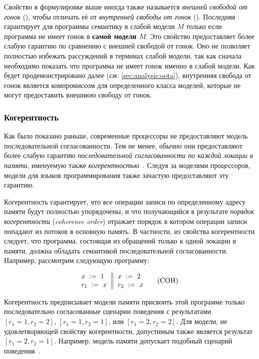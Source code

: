 Свойство \DRF в формулировке выше иногда также называется
\emph{внешней свободой от гонок} (\eDRF), 
чтобы отличать её от \emph{внутренней свободы от гонок} (\iDRF).
Последняя гарантирует для программы семантику \SC
в слабой модели $M$ только если программа 
не имеет гонок в \textbf{самой модели $M$}.
Это свойство предоставляет более слабую гарантию
по сравнению с внешней свободой от гонок. 
Оно не позволяет полностью избежать рассуждений 
в терминах слабой модели, так как 
сначала необходимо показать что программа не имеет 
гонок именно в слабой модели. 
Как будет продемонстрировано далее (\emph{см.} \cref{sec:analysis:oota}), 
внутренняя свобода от гонок является компромиссом 
для определенного класса моделей, которые не могут 
предоставить внешнюю свободу от гонок. 

\subsubsection{Когерентность}
\label{sec:background:coh}

Как было показано раньше, современные процессоры
не предоставляют модель последовательной согласованности. 
Тем не менее, обычно они предоставляют более слабую 
гарантию \emph{последовательной согласованности 
по каждой локации в памяти}, именуемую также 
\emph{когерентностью}~\cite{Alglave-al:TOPLAS14}. 
Следуя за моделями процессоров, модели 
для языков программирования также зачастую предоставляют эту гарантию.

Когерентность гарантирует, что все операции записи 
по определенному адресу памяти будут полностью упорядочены,
и что получающийся в результате \emph{порядок когерентности} 
(\emph{coherence order}) отражает порядок 
в котором операции записи попадают из потоков в основную память.
В частности, из свойства когерентности следует, 
что программа, состоящая из обращений только 
к одной локации в памяти, должна 
обладать семантикой последовательной согласованности.
Например, рассмотрим следующую программу:

\begin{equation*}
\inarrII{
   \writeInst{}{x}{1}   \\
   \readInst{}{r_1}{x}  \\
}{
   \writeInst{}{x}{2}   \\
   \readInst{}{r_2}{x}  \\
}
\tag{COH}\label{ex:coh}
\end{equation*}

Когерентность предписывает модели памяти 
присвоить этой программе только последовательно 
согласованные сценарии поведения с результатами
${[r_1=1, r_2=2]}$, ${[r_1=1, r_2=1]}$, или ${[r_1=2, r_2=2]}$.
Для модели, не удовлетворяющей свойству когерентности, 
допустимым также является результат ${[r_1=2, r_2=1]}$.
Например, модель памяти \Java допускает подобный сценарий поведения~\cite{Manson-al:POPL05}.

